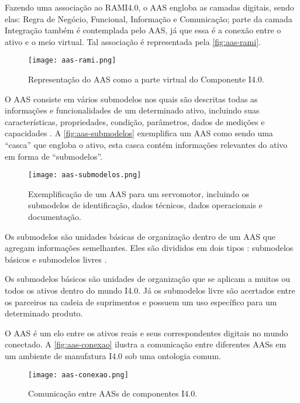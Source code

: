 	Fazendo uma associação ao RAMI4.0, o AAS engloba as camadas digitais, sendo elas: Regra de Negócio, Funcional, Informação e Comunicação; parte da camada Integração também é contemplada pelo AAS, já que essa é a conexão entre o ativo e o meio virtual. Tal associação é representada pela \autoref{fig:aas-rami}.

	\begin{figure}[htb]
		\centering
		\label{fig:aas-rami}
		\texttt{[image: aas-rami.png]}
		\caption{Representação do AAS como a parte virtual do Componente I4.0.}
	\end{figure}
		
	O AAS consiste em vários submodelos nos quais são descritas todas as informações e funcionalidades de um determinado ativo, incluindo suas características, propriedades, condição, parâmetros, dados de medições e capacidades \cite{bader2019aas}. A \autoref{fig:aas-submodelos} exemplifica um AAS como sendo uma ``casca'' que engloba o ativo, esta casca contém informações relevantes do ativo em forma de ``submodelos''.
	
	\begin{figure}[htb]
		\centering
		\label{fig:aas-submodelos}
		\texttt{[image: aas-submodelos.png]}
		\caption{Exemplificação de um AAS para um servomotor, incluindo os submodelos de identificação, dados técnicos, dados operacionais e documentação.}
	\end{figure}

	Os submodelos são unidades básicas de organização dentro de um AAS que agregam informações semelhantes. Eles são divididos em dois tipos \cite{plattform2019detailsaas}: submodelos básicos e submodelos livres \cite{bader2019aas}.
	
	Os submodelos básicos são unidades de organização que se aplicam a muitos ou todos os ativos dentro do mundo I4.0. Já os submodelos livre são acertados entre os parceiros na cadeia de suprimentos e possuem um uso específico para um determinado produto.
	
	O AAS é um elo entre os ativos reais e seus correspondentes digitais no mundo conectado. A \autoref{fig:aas-conexao} ilustra a comunicação entre diferentes AASs em um ambiente de manufatura I4.0 sob uma ontologia comum.
	
	\begin{figure}[htb]
		\centering
		\label{fig:aas-conexao}
		\texttt{[image: aas-conexao.png]}
		\caption{Comunicação entre AASs de componentes I4.0.}
	\end{figure}

